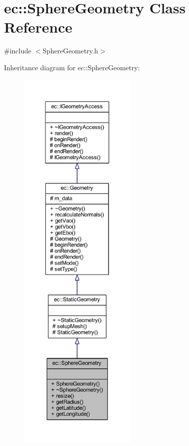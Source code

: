 \hypertarget{classec_1_1_sphere_geometry}{}\section{ec\+:\+:Sphere\+Geometry Class Reference}
\label{classec_1_1_sphere_geometry}


{\ttfamily \#include $<$Sphere\+Geometry.\+h$>$}



Inheritance diagram for ec\+:\+:Sphere\+Geometry\+:\nopagebreak
\begin{figure}[H]
\begin{center}
\leavevmode
\includegraphics[height=550pt]{classec_1_1_sphere_geometry__inherit__graph}
\end{center}
\end{figure}


